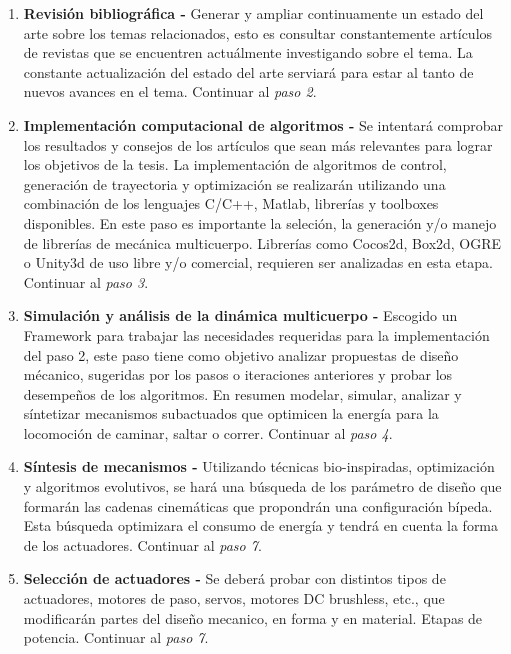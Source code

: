 \begin{enumerate}
\item \textbf{Revisi\'on bibliogr\'afica -} Generar y ampliar continuamente un estado del arte sobre los temas relacionados, esto es consultar constantemente art\'iculos de revistas que se encuentren actu\'almente investigando sobre el tema. La constante actualizaci\'on del estado del arte serviar\'a para estar al tanto de nuevos avances en el tema. Continuar al \emph{paso 2}.\par
\item \textbf{Implementaci\'on computacional de algoritmos -} Se intentar\'a comprobar los resultados y consejos de los art\'iculos que sean m\'as relevantes para lograr los objetivos de la tesis. La implementaci\'on de algoritmos de control, generaci\'on de trayectoria y optimizaci\'on se realizar\'an utilizando una combinaci\'on de los lenguajes C/C++, Matlab, librer\'ias y toolboxes disponibles. En este paso es importante la seleci\'on, la generaci\'on y/o manejo de librer\'ias de mec\'anica multicuerpo. Librer\'ias como Cocos2d, Box2d, OGRE o Unity3d de uso libre y/o comercial, requieren ser analizadas en esta etapa. Continuar al \emph{paso 3}.\par
\item \textbf{Simulaci\'on y an\'alisis de la din\'amica multicuerpo - } Escogido un Framework para trabajar las necesidades requeridas para la implementaci\'on del paso 2, este paso tiene como objetivo analizar propuestas de dise\~no m\'ecanico, sugeridas por los pasos o iteraciones anteriores y probar los desempe\~nos de los algoritmos. En resumen modelar, simular, analizar y s\'intetizar mecanismos subactuados que optimicen la energ\'ia para la locomoci\'on de caminar, saltar o correr. Continuar al \emph{paso 4}.\par
\item \textbf{S\'intesis de mecanismos - } Utilizando t\'ecnicas bio-inspiradas, optimizaci\'on y algoritmos evolutivos, se har\'a una b\'usqueda de los parámetro de dise\~no que formar\'an las cadenas cinem\'aticas que propondrán una configuraci\'on b\'ipeda. Esta búsqueda optimizara el consumo de energ\'ia y tendrá en cuenta la forma de los actuadores. Continuar al \emph{paso 7}.\par
\item \textbf{Selecci\'on de actuadores - } Se deber\'a probar con distintos tipos de actuadores, motores de paso, servos, motores DC brushless, etc., que modificar\'an partes del dise\~no mecanico, en forma y en material. Etapas de potencia. Continuar al \emph{paso 7}.\par

\end{enumerate}
